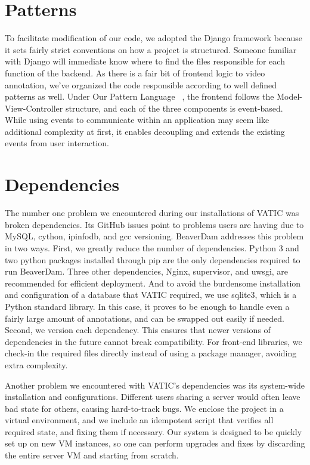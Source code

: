 \section{Patterns}

To facilitate modification of our code, we adopted the Django framework because it sets fairly strict conventions on how a project is structured.
Someone familiar with Django will immediate know where to find the files responsible for each function of the backend.
As there is a fair bit of frontend logic to video annotation, we've organized the code responsible according to well defined patterns as well.
Under Our Pattern Language ~\cite{opl}, the frontend follows the Model-View-Controller structure, and each of the three components is event-based.
While using events to communicate within an application may seem like additional complexity at first, it enables decoupling and extends the existing events from user interaction.

\section{Dependencies}

The number one problem we encountered during our installations of VATIC was broken dependencies.
Its GitHub issues point to problems users are having due to MySQL, cython, ipinfodb, and gcc versioning.
BeaverDam addresses this problem in two ways.
First, we greatly reduce the number of dependencies.
Python 3 and two python packages installed through pip are the only dependencies required to run BeaverDam.
Three other dependencies, Nginx, supervisor, and uwsgi, are recommended for efficient deployment.
And to avoid the burdensome installation and configuration of a database that VATIC required, we use sqlite3, which is a Python standard library.
In this case, it proves to be enough to handle even a fairly large amount of annotations, and can be swapped out easily if needed.
Second, we version each dependency.
This ensures that newer versions of dependencies in the future cannot break compatibility.
For front-end libraries, we check-in the required files directly instead of using a package manager, avoiding extra complexity.

Another problem we encountered with VATIC's dependencies was its system-wide installation and configurations.
Different users sharing a server would often leave bad state for others, causing hard-to-track bugs.
We enclose the project in a virtual environment, and we include an idempotent script that verifies all required state, and fixing them if necessary.
Our system is designed to be quickly set up on new VM instances,
so one can perform upgrades and fixes by discarding the entire server VM and starting from scratch.

